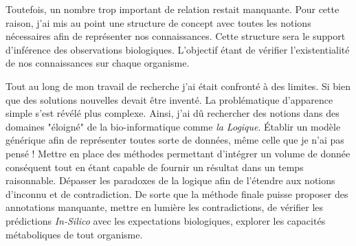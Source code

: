 \begin{refsection}
Toutefois, un nombre trop important de relation restait manquante. Pour cette raison, j'ai mis au point une structure de concept avec toutes les notions nécessaires afin de représenter nos connaissances. Cette structure sera le support d'inférence des observations biologiques. L'objectif étant de vérifier l'existentialité de nos connaissances sur chaque organisme.

Tout au long de mon travail de recherche j'ai était confronté à des limites. Si bien que des solutions nouvelles devait être inventé. La problématique d'apparence simple s'est révélé plus complexe. Ainsi, j'ai dû rechercher des notions dans des domaines "éloigné" de la bio-informatique comme \textit{la Logique}. Établir un modèle générique afin de représenter toutes sorte de données, même celle que je n'ai pas pensé !  Mettre en place des méthodes permettant d'intégrer un volume de donnée conséquent tout en étant capable de fournir un résultat dans un temps raisonnable. Dépasser les paradoxes de la logique afin de l'étendre aux notions d'inconnu et de contradiction. De sorte que la méthode finale puisse proposer des annotations manquante, mettre en lumière les contradictions, de vérifier les prédictions \textit{In-Silico} avec les expectations biologiques, explorer les capacités métaboliques de tout organisme.

\begin{SingleSpace}
    \setlength\bibitemsep{1em}
    \printbibliography[segment=\therefsegment,heading=subbibliography]
\end{SingleSpace}
\end{refsection}